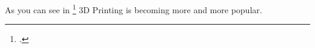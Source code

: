 \documentclass[11pt,a4paper]{article}
\begin{document}
As you can see in \footcite{FORT}
3D Printing is becoming more and more popular.

\newpage

\printbibliography
\end{document}
